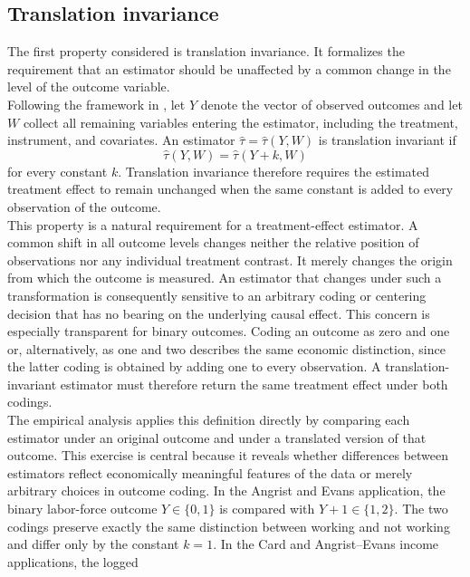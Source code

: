 \documentclass[12pt, a4paper, oneside]{article}
\theoremstyle{plain}
\theoremstyle{definition}
\begin{document}
\subsection{Translation invariance}
\label{subsec:translation_invariance}
The first property considered is translation invariance. It formalizes the requirement
that an estimator should be unaffected by a common change in the level of the outcome
variable. \\
Following the framework in \citet{sloczynski2025abadie}, let \(Y\) denote the vector of observed
outcomes and let \(W\) collect all remaining variables entering the estimator, including
the treatment, instrument, and covariates. An estimator
\(\widehat{\tau}=\widehat{\tau}(Y,W)\) is translation invariant if
\begin{equation}
\widehat{\tau}(Y,W)
=
\widehat{\tau}(Y+k,W)
\end{equation}
for every constant \(k\). Translation invariance therefore requires the estimated
treatment effect to remain unchanged when the same constant is added to every
observation of the outcome. \\
This property is a natural requirement for a treatment-effect estimator. A common shift
in all outcome levels changes neither the relative position of observations nor any
individual treatment contrast. It merely changes the origin from which the outcome is
measured. An estimator that changes under such a transformation is consequently
sensitive to an arbitrary coding or centering decision that has no bearing on the
underlying causal effect. This concern is especially transparent for binary outcomes.
Coding an outcome as zero and one or, alternatively, as one and two describes the same
economic distinction, since the latter coding is obtained by adding one to every
observation. A translation-invariant estimator must therefore return the same treatment
effect under both codings.\\
The empirical analysis applies this definition directly by comparing each estimator
under an original outcome and under a translated version of that outcome. This
exercise is central because it reveals whether differences between
estimators reflect economically meaningful features of the data or merely arbitrary
choices in outcome coding. In the Angrist and Evans application, the binary labor-force
outcome \(Y\in\{0,1\}\) is compared with \(Y+1\in\{1,2\}\). The two codings preserve
exactly the same distinction between working and not working and differ only by the
constant \(k=1\). In the Card and Angrist--Evans income applications, the logged
\end{document}
